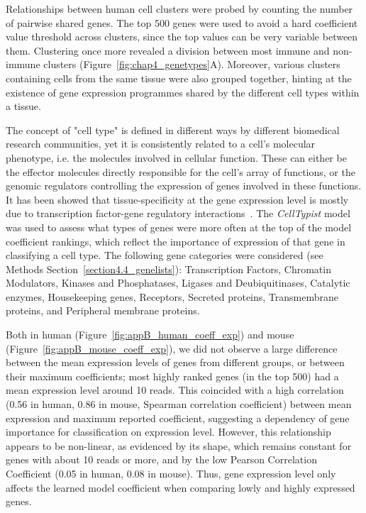 Relationships between human cell clusters were probed by counting the number of pairwise shared genes. The top 500 genes were used to avoid a hard coefficient value threshold across clusters, since the top values can be very variable between them. Clustering once more revealed a division between most immune and non-immune clusters (Figure~\ref{fig:chap4_genetypes}A). Moreover, various clusters containing cells from the same tissue were also grouped together, hinting at the existence of gene expression programmes shared by the different cell types within a tissue. 

The concept of "cell type" is defined in different ways by different biomedical research communities, yet it is consistently related to a cell's molecular phenotype, i.e. the molecules involved in cellular function. These can either be the effector molecules directly responsible for the cell's array of functions, or the genomic regulators controlling the expression of genes involved in these functions. It has been showed that tissue-specificity at the gene expression level is mostly due to transcription factor-gene regulatory interactions~\citep{sonawane_understanding_2017}. The \textit{CellTypist} model was used to assess what types of genes were more often at the top of the model coefficient rankings, which reflect the importance of expression of that gene in classifying a cell type. The following gene categories were considered (see Methods Section~\ref{section4.4_genelists}): Transcription Factors, Chromatin Modulators, Kinases and Phosphatases, Ligases and Deubiquitinases, Catalytic enzymes, Housekeeping genes, Receptors, Secreted proteins, Transmembrane proteins, and Peripheral membrane proteins. 

Both in human (Figure~\ref{fig:appB_human_coeff_exp}) and mouse (Figure~\ref{fig:appB_mouse_coeff_exp}), we did not observe a large difference between the mean expression levels of genes from different groups, or between their maximum coefficients; most highly ranked genes (in the top 500) had a mean expression level around 10 reads. This coincided with a high correlation (0.56 in human, 0.86 in mouse, Spearman correlation coefficient) between mean expression and maximum reported coefficient, suggesting a dependency of gene importance for classification on expression level. However, this relationship appears to be non-linear, as evidenced by its shape, which remains constant for genes with about 10 reads or more, and by the low Pearson Correlation Coefficient (0.05 in human, 0.08 in mouse). Thus, gene expression level only affects the learned model coefficient when comparing lowly and highly expressed genes.


